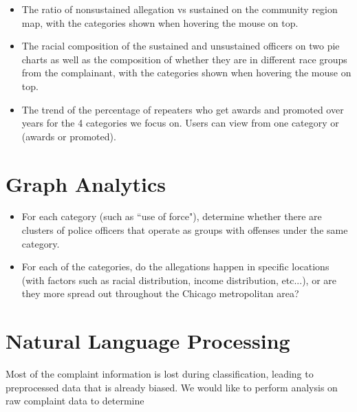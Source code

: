 \documentclass[12pt]{article}
\begin{document}
\begin{itemize}

\item The ratio of nonsustained allegation vs sustained on the community region map, with the categories shown when hovering the mouse on top.

\item The racial composition of the sustained and unsustained officers on two pie charts as well as the composition of whether they are in different race groups from the complainant, with the categories shown when hovering the mouse on top.

\item The trend of the percentage of repeaters who get awards and promoted over years for the 4 categories we focus on. Users can view from one category or (awards or promoted).

\end{itemize}




\section{Graph Analytics}

\begin{itemize}

\item For each category (such as ``use of force"), determine whether there are clusters of police officers that operate as groups with offenses under the same category.

\item For each of the categories, do the allegations happen in specific locations (with factors such as racial distribution, income distribution, etc...), or are they more spread out throughout the Chicago metropolitan area?

\end{itemize}



\section{Natural Language Processing}

Most of the complaint information is lost during classification, leading to preprocessed data that is already biased. We would like to perform analysis on raw complaint data to determine
\end{document}
